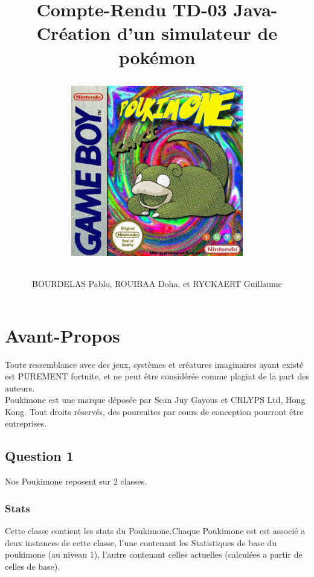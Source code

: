 \documentclass{report}
\begin{document}
\title{%
    \begin{minipage}\linewidth
        \centering
        Compte-Rendu TD-03 
        \vskip 3pt
        \large Java-Création d'un simulateur de pokémon
        \author{BOURDELAS Pablo, ROUIBAA Doha, et RYCKAERT Guillaume}
    \end{minipage}
\begin{figure}[ht!]
    \centering
    \includegraphics[width=75mm]{cover.jpg}
\end{figure}
    }   

\maketitle

\chapter*{Avant-Propos}
Toute ressemblance avec des jeux, systèmes et créatures imaginaires ayant existé est PUREMENT fortuite, et ne peut être considérée comme plagiat de la part des auteurs.\\
Poukimone est une marque déposée par Sean Juy Gayous et CRLYPS Ltd, Hong Kong. Tout droits réservés, des poursuites par cours de conception pourront être entreprises.
 
\newpage
\section*{Question 1}

Nos Poukimone reposent sur 2 classes.
\subsection*{Stats}
Cette classe contient les stats du Poukimone.Chaque Poukimone est est associé a deux instances de cette classe, l'une contenant les Statistiques de base du poukimone (au niveau 1), l'autre contenant celles actuelles (calculées a partir de celles de base).
\end{document}
